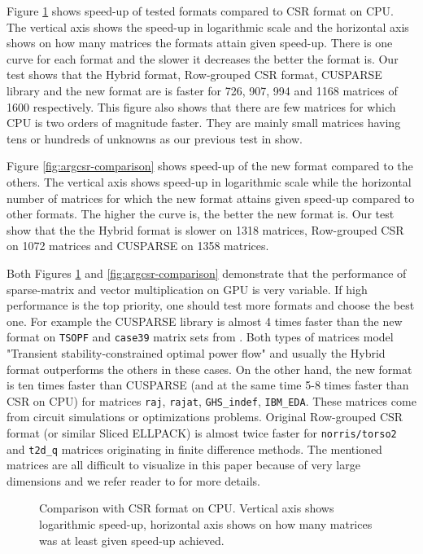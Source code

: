 \documentclass{pj}
\begin{document}
 Figure \ref{fig:csr-comparison} shows speed-up of tested formats compared to CSR format on CPU. The vertical axis shows the speed-up in logarithmic scale and the horizontal axis shows on how many matrices the formats attain given speed-up. There is one curve for each format and the slower it decreases the better the format is. Our test shows that the Hybrid format, Row-grouped CSR format, CUSPARSE library and the new format are is faster for 726, 907, 994 and 1168 matrices of 1600 respectively. This figure also shows that there are few matrices for which CPU is two orders of magnitude faster. They are mainly small matrices having tens or hundreds of unknowns as our previous test in \cite{OberhuberSuzukiVacata-2011} show.

Figure \ref{fig:argcsr-comparison} shows speed-up of the new format compared to the others. The vertical axis shows speed-up in logarithmic scale while the horizontal number of matrices for which the new format attains given speed-up compared to other formats. The higher the curve is, the better the new format is. Our test show that the the Hybrid format is slower on 1318 matrices, Row-grouped CSR on 1072 matrices and CUSPARSE on 1358 matrices. 

Both Figures \ref{fig:csr-comparison} and \ref{fig:argcsr-comparison} demonstrate that the performance of sparse-matrix and vector multiplication on GPU is very variable. If high performance is the top priority, one should test more formats and choose the best one. For example the CUSPARSE library is almost 4 times faster than the new format on {\tt TSOPF} and {\tt case39} matrix sets from \cite{DavisHu-1994}. Both types of matrices model "Transient stability-constrained optimal power flow" and usually the Hybrid format outperforms the others in these cases. On the other hand, the new format is ten times faster than CUSPARSE (and at the same time 5-8 times faster than CSR on CPU) for matrices {\tt raj}, {\tt rajat}, {\tt GHS\_indef}, {\tt IBM\_EDA}. These matrices come from circuit simulations or optimizations problems. Original Row-grouped CSR format (or similar Sliced ELLPACK) is almost twice faster for {\tt norris/torso2} and {\tt t2d\_q} matrices originating in finite difference methods. The mentioned matrices are all difficult to visualize in this paper because of very large dimensions and we refer reader to \cite{DavisHu-1994} for more details.

\begin{figure}[]
\caption{Comparison with CSR format on CPU. Vertical axis shows logarithmic speed-up, horizontal axis shows on how many matrices was at least given speed-up achieved.}
\label{fig:csr-comparison}
\end{figure}
\end{document}
